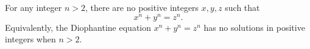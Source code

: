 For any integer $n > 2$, there are no positive integers $x, y, z$ such that
$$x^n + y^n = z^n.$$
Equivalently, the Diophantine equation $x^n + y^n = z^n$ has no solutions in positive integers when $n > 2$.
